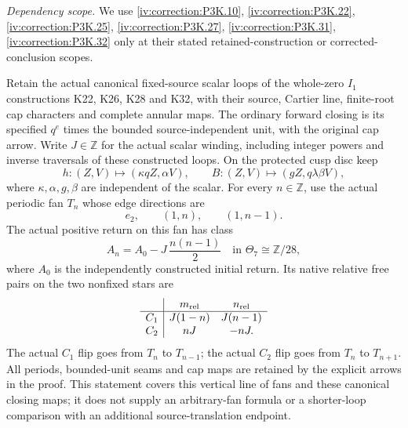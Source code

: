 \begin{theorem}\hypertarget{tag-02VB}{}\label{night:P3K.64}

\par\noindent\textit{Dependency scope.} We use \cref{iv:correction:P3K.10}, \cref{iv:correction:P3K.22}, \cref{iv:correction:P3K.25}, \cref{iv:correction:P3K.27}, \cref{iv:correction:P3K.31}, \cref{iv:correction:P3K.32} only at their stated retained-construction or corrected-conclusion scopes.



Retain the actual canonical fixed-source scalar loops of the whole-zero
\(I_1\) constructions K22, K26, K28 and K32, with their source,
Cartier line, finite-root cap characters and complete annular maps.
The ordinary forward closing is its specified \(q^e\) times the
bounded source-independent unit, with the original cap arrow.
Write \(J\in\mathbb Z\) for the actual scalar winding, including
integer powers and inverse traversals of these constructed loops.
On the protected cusp disc keep
\[
 h:(Z,V)\mapsto(\kappa qZ,\alpha V),\qquad
 B:(Z,V)\mapsto(gZ,q\lambda\beta V),
\]
where \(\kappa,\alpha,g,\beta\) are independent of the scalar.
For every \(n\in\mathbb Z\), use the actual periodic fan \(T_n\)
whose edge directions are
\[
                    e_2,\qquad (1,n),\qquad(1,n-1).
\]
The actual positive return on this fan has class
\[
        A_n=A_0-J\,\frac{n(n-1)}2
                  \quad\text{in }\Theta_7\cong\mathbb Z/28,
 \tag{P3K.64.0}
\]
where \(A_0\) is the independently constructed initial return.
Its native relative free pairs on the two nonfixed stars are
\[
 \begin{array}{c|cc}
  &m_{\rm rel}&n_{\rm rel}\\ \hline
 C_1&J(1-n)&J(n-1)\\
 C_2&nJ&-nJ.
 \end{array}
\]
The actual \(C_1\) flip goes from \(T_n\) to \(T_{n-1}\);
the actual \(C_2\) flip goes from \(T_n\) to \(T_{n+1}\).
All periods, bounded-unit seams and cap maps are retained by
the explicit arrows in the proof. This statement covers this
vertical line of fans and these canonical closing maps; it
does not supply an arbitrary-fan formula or a shorter-loop
comparison with an additional source-translation endpoint.
\end{theorem}

